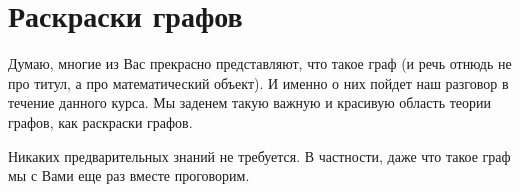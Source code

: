 
\section*{Раскраски графов}



Думаю, многие из Вас прекрасно представляют, что такое граф
(и речь отнюдь не про титул, а про математический объект).
И именно о них пойдет наш разговор в течение данного курса.
Мы заденем такую важную и красивую область теории графов, как раскраски графов.

Никаких предварительных знаний не требуется.
В частности, даже что такое граф мы с Вами еще раз вместе проговорим.

